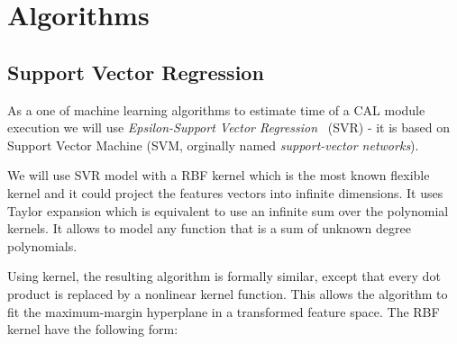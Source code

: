 \section{Algorithms}
\subsection{Support Vector Regression}

As a one of machine learning algorithms to estimate time of a CAL module execution we will use \textit{Epsilon-Support Vector Regression}~\cite{svrc} (SVR) - it is based on Support Vector Machine (SVM, orginally named \textit{support-vector networks}\cite{svm}).

We will use SVR model with a RBF kernel\cite{rbf_kernel} which is the most known flexible kernel and it could project the features vectors into infinite dimensions. It uses Taylor expansion which is equivalent to use an infinite sum over the polynomial kernels. It allows to model any function that is a sum of unknown degree polynomials.

Using kernel, the resulting algorithm is formally similar, except that every dot product is replaced by a nonlinear kernel function. This allows the algorithm to fit the maximum-margin hyperplane in a transformed feature space. The RBF kernel have the following form:

